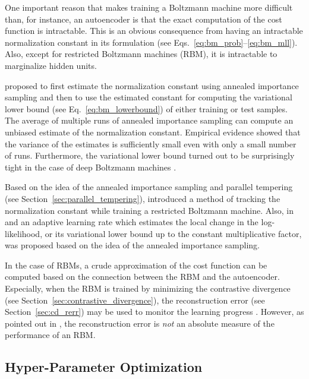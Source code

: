 \documentclass[dissertation,nocontribution,draft*]{aaltoseries}
\begin{document}
One important reason that makes training a Boltzmann machine
more difficult than, for instance, an autoencoder is that
the exact computation of the cost function is intractable.
This is an obvious consequence from having an intractable
normalization constant in its formulation (see
Eqs.~\eqref{eq:bm_prob}--\eqref{eq:bm_mll}). Also,
except for restricted Boltzmann machines (RBM), it is
intractable to marginalize hidden units.

\citet{Salakhutdinov2008a} proposed to first estimate the
normalization constant using annealed importance sampling
\citep{Neal1998} and then to use the estimated constant for
computing the variational lower bound (see
Eq.~\eqref{eq:bm_lowerbound}) of either training or test
samples. The average of multiple runs of annealed
importance sampling can compute an unbiased estimate of the
normalization constant. Empirical evidence
\citep{Salakhutdinov2008} showed that the variance of the
estimates is sufficiently small even with only a small
number of runs.  Furthermore, the variational lower bound
turned out to be surprisingly tight in the case of deep
Boltzmann machines \citep{Salakhutdinov2012nc}.

Based on the idea of the annealed importance sampling and
parallel tempering (see
Section~\ref{sec:parallel_tempering}),
\citet{Desjardins2011} introduced a method of tracking the
normalization constant while training a restricted Boltzmann
machine. Also, in  and
 an adaptive learning rate which
estimates the local change in the log-likelihood, or its
variational lower bound up to the constant multiplicative
factor, was
proposed based on the idea of the annealed importance
sampling.

In the case of RBMs, a crude approximation of the cost
function can be computed based on the connection between the
RBM and the autoencoder. Especially, when the RBM is trained
by minimizing the contrastive divergence (see
Section~\ref{sec:contrastive_divergence}), the
reconstruction error (see Section~\ref{sec:cd_rerr}) may be
used to monitor the learning progress \citep{Hinton2012rbm}.
However, as pointed out in \citep{Hinton2012rbm}, the
reconstruction error is \textit{not} an absolute measure of
the performance of an RBM.

\subsection{Hyper-Parameter Optimization}
\label{sec:hyperopt}
\end{document}
